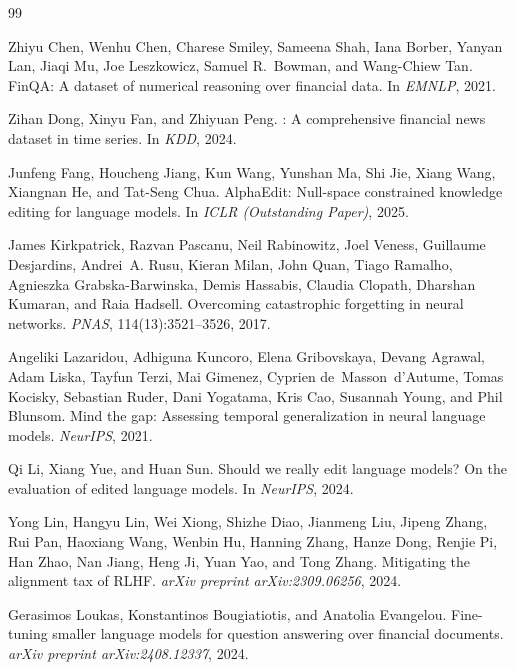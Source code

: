 \documentclass{article}
\begin{document}

\begin{thebibliography}{99}

Zhiyu Chen, Wenhu Chen, Charese Smiley, Sameena Shah, Iana Borber, Yanyan Lan, Jiaqi Mu, Joe Leszkowicz, Samuel R.~Bowman, and Wang-Chiew Tan.
\newblock Fin{QA}: A dataset of numerical reasoning over financial data.
\newblock In \emph{EMNLP}, 2021.

Zihan Dong, Xinyu Fan, and Zhiyuan Peng.
: A comprehensive financial news dataset in time series.
\newblock In \emph{KDD}, 2024.

Junfeng Fang, Houcheng Jiang, Kun Wang, Yunshan Ma, Shi Jie, Xiang Wang, Xiangnan He, and Tat-Seng Chua.
\newblock Alpha{E}dit: Null-space constrained knowledge editing for language models.
\newblock In \emph{ICLR (Outstanding Paper)}, 2025.

James Kirkpatrick, Razvan Pascanu, Neil Rabinowitz, Joel Veness, Guillaume Desjardins, Andrei~A. Rusu, Kieran Milan, John Quan, Tiago Ramalho, Agnieszka Grabska-Barwinska, Demis Hassabis, Claudia Clopath, Dharshan Kumaran, and Raia Hadsell.
\newblock Overcoming catastrophic forgetting in neural networks.
\newblock \emph{PNAS}, 114(13):3521--3526, 2017.

Angeliki Lazaridou, Adhiguna Kuncoro, Elena Gribovskaya, Devang Agrawal, Adam Liska, Tayfun Terzi, Mai Gimenez, Cyprien de~Masson~d'Autume, Tomas Kocisky, Sebastian Ruder, Dani Yogatama, Kris Cao, Susannah Young, and Phil Blunsom.
\newblock Mind the gap: Assessing temporal generalization in neural language models.
\newblock \emph{NeurIPS}, 2021.

Qi Li, Xiang Yue, and Huan Sun.
\newblock Should we really edit language models? {O}n the evaluation of edited language models.
\newblock In \emph{NeurIPS}, 2024.

Yong Lin, Hangyu Lin, Wei Xiong, Shizhe Diao, Jianmeng Liu, Jipeng Zhang, Rui Pan, Haoxiang Wang, Wenbin Hu, Hanning Zhang, Hanze Dong, Renjie Pi, Han Zhao, Nan Jiang, Heng Ji, Yuan Yao, and Tong Zhang.
\newblock Mitigating the alignment tax of {RLHF}.
\newblock \emph{arXiv preprint arXiv:2309.06256}, 2024.

Gerasimos Loukas, Konstantinos Bougiatiotis, and Anatolia Evangelou.
\newblock Fine-tuning smaller language models for question answering over financial documents.
\newblock \emph{arXiv preprint arXiv:2408.12337}, 2024.


\end{thebibliography}
\end{document}
